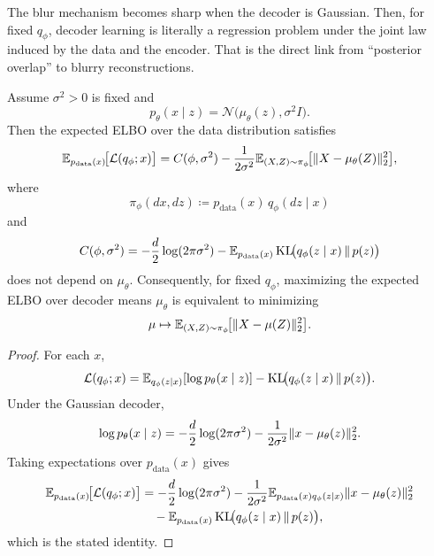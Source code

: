 \documentclass[11pt]{article}
\begin{document}
The blur mechanism becomes sharp when the decoder is Gaussian.
Then, for fixed \(q_\phi\), decoder learning is literally a regression problem under the joint law induced by the data and the encoder.
That is the direct link from ``posterior overlap'' to blurry reconstructions.

\begin{proposition}
\label{prop:gaussian-vae-regression}
Assume \(\sigma^2>0\) is fixed and
\[
  p_\theta(x\mid z)=\mathcal{N}\!\bigl(\mu_\theta(z),\sigma^2 I\bigr).
\]
Then the expected ELBO over the data distribution satisfies
\[
  \mathbb{E}_{p_{\mathrm{data}}(x)}\!\bigl[\mathcal{L}(q_\phi;x)\bigr]
  =
  C(\phi,\sigma^2)
  -
  \frac{1}{2\sigma^2}
  \mathbb{E}_{(X,Z)\sim \pi_\phi}\!\bigl[\lVert X-\mu_\theta(Z)\rVert_2^2\bigr],
\]
where
\[
  \pi_\phi(dx,dz)\coloneqq p_{\mathrm{data}}(x)\,q_\phi(dz\mid x)
\]
and
\[
  C(\phi,\sigma^2)
  =
  -\frac{d}{2}\log(2\pi\sigma^2)
  -
  \mathbb{E}_{p_{\mathrm{data}}(x)}
  \operatorname{KL}\!\bigl(q_\phi(z\mid x)\,\|\,p(z)\bigr)
\]
does not depend on \(\mu_\theta\).
Consequently, for fixed \(q_\phi\), maximizing the expected ELBO over decoder means \(\mu_\theta\) is equivalent to minimizing
\[
  \mu\mapsto
  \mathbb{E}_{(X,Z)\sim \pi_\phi}\!\bigl[\lVert X-\mu(Z)\rVert_2^2\bigr].
\]
\end{proposition}
\begin{proof}
For each \(x\),
\[
  \mathcal{L}(q_\phi;x)
  =
  \mathbb{E}_{q_\phi(z\mid x)}[\log p_\theta(x\mid z)]
  -
  \operatorname{KL}\!\bigl(q_\phi(z\mid x)\,\|\,p(z)\bigr).
\]
Under the Gaussian decoder,
\[
  \log p_\theta(x\mid z)
  =
  -\frac{d}{2}\log(2\pi\sigma^2)
  -
  \frac{1}{2\sigma^2}\lVert x-\mu_\theta(z)\rVert_2^2.
\]
Taking expectations over \(p_{\mathrm{data}}(x)\) gives
\begin{align*}
  \mathbb{E}_{p_{\mathrm{data}}(x)}\!\bigl[\mathcal{L}(q_\phi;x)\bigr]
  &=
  -\frac{d}{2}\log(2\pi\sigma^2)
  -
  \frac{1}{2\sigma^2}
  \mathbb{E}_{p_{\mathrm{data}}(x)q_\phi(z\mid x)}
  \lVert x-\mu_\theta(z)\rVert_2^2 \\
  &\quad
  -
  \mathbb{E}_{p_{\mathrm{data}}(x)}
  \operatorname{KL}\!\bigl(q_\phi(z\mid x)\,\|\,p(z)\bigr),
\end{align*}
which is the stated identity.%
\end{proof}
\end{document}
